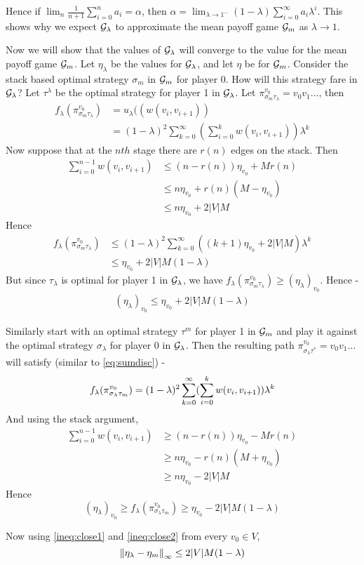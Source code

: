 Hence if $\lim_n \frac{1}{n+1} \sum_{i=0}^n a_i = \alpha$, then $\alpha = \lim_{\lambda \to 1^-} (1-\lambda) \sum_{i=0}^\infty a_i \lambda^i$. This shows why we expect $\mathcal{G}_\lambda$ to approximate the mean payoff game $\mathcal{G}_m$ as $\lambda \to 1$.

Now we will show that the values of $\mathcal{G}_\lambda$ will converge to the value for the mean payoff game $\mathcal{G}_m$. Let $\eta_\lambda$ be the values for $\mathcal{G}_\lambda$, and let $\eta$ be for $\mathcal{G}_m$. Consider the stack based optimal strategy $\sigma_m$ in $\mathcal{G}_m$ for player 0. How will this strategy fare in $\mathcal{G}_\lambda$? Let $\tau^\lambda$ be the optimal strategy for player 1 in $\mathcal{G}_\lambda$. Let $\pi^{v_0}_{\sigma_m\tau_\lambda}=v_0v_1 \ldots$, then 
\begin{align}
    f_\lambda(\pi^{v_0}_{\sigma_m\tau_\lambda}) &= u_\lambda((w(v_i,v_{i+1}))\\
    &= (1-\lambda)^2 \sum_{k=0}^\infty (\sum_{i=0}^k w(v_i,v_{i+1})) \lambda^k \label{eq:sumdisc}
\end{align}
Now suppose that at the $nth$ stage there are $r(n)$ edges on the stack. Then
\begin{align}
    \sum_{i=0}^{n-1} w(v_i,v_{i+1}) &\leq (n-r(n)) \eta_{v_0} + M r(n)\\
    &\leq n \eta_{v_0} + r(n)(M-\eta_{v_0})\\
    &\leq n \eta_{v_0} + 2|V|M
\end{align}
Hence
\begin{align}
    f_\lambda(\pi^{v_0}_{\sigma_m\tau_\lambda}) &\leq (1-\lambda)^2 \sum_{k=0}^\infty ((k+1)\eta_{v_0} + 2|V|M)\lambda^k\\
    &\leq \eta_{v_0} + 2|V|M (1-\lambda)
\end{align}
But since $\tau_\lambda$ is optimal for player 1 in $\mathcal{G}_\lambda$, we have $f_\lambda(\pi^{v_0}_{\sigma_m\tau_\lambda}) \geq (\eta_\lambda)_{v_0}$. Hence -
\begin{align}
    (\eta_\lambda)_{v_0} \leq \eta_{v_0} + 2|V|M (1-\lambda) \label{ineq:close1}
\end{align}

Similarly start with an optimal strategy $\tau^m$ for player 1 in $\mathcal{G}_m$ and play it against the optimal strategy $\sigma_\lambda$ for player 0 in $\mathcal{G}_\lambda$. Then the resulting path $\pi^{v_0}_{\sigma_\lambda\tau^*}=v_0v_1\ldots$ will satisfy (similar to \eqref{eq:sumdisc}) - 
\[
    f_\lambda(\pi^{v_0}_{\sigma_\lambda\tau_m}) = (1-\lambda)^2 \sum_{k=0}^\infty (\sum_{i=0}^k w(v_i,v_{i+1})) \lambda^k  \\
\]
And using the stack argument, 
\begin{align}
    \sum_{i=0}^{n-1} w(v_i,v_{i+1}) &\geq (n-r(n)) \eta_{v_0} - M r(n)\\
    &\geq n \eta_{v_0} - r(n)(M+\eta_{v_0})\\
    &\geq n \eta_{v_0} - 2|V|M
\end{align}
Hence 
\begin{equation}
    (\eta_\lambda)_{v_0} \geq f_\lambda(\pi^{v_0}_{\sigma_\lambda\tau_m}) \geq \eta_{v_0} - 2|V|M (1-\lambda) \label{ineq:close2}
\end{equation}

Now using \eqref{ineq:close1} and \eqref{ineq:close2} from every $v_0 \in V$,
\begin{equation}
    \left\lVert\eta_\lambda - \eta_m\right\rVert_\infty \leq 2|V|M(1-\lambda)
\end{equation}
